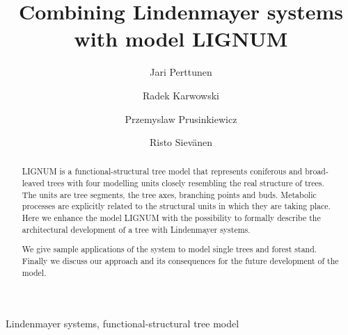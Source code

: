 \documentclass{elsart}
\begin{document}
\begin{frontmatter}


\title{Combining Lindenmayer systems with model LIGNUM}
\author[Metla]{Jari Perttunen}
\author[Calgary]{Radek Karwowski}
\author[Calgary]{Przemyslaw Prusinkiewicz}
\author[Metla]{Risto Siev\"anen}

\address[Metla]{Finnish Forest Research Insititute. Vantaa Research Station. 
                              Jokiniemenkuja 1. PL 18. 01301 Vantaa. Finland.}
\address[Calgary]{University of Calgary}




\begin{abstract}
  LIGNUM  is  a   functional-structural  tree  model  that  represents
  coniferous and broad-leaved trees  with four modelling units closely
  resembling  the  real  structure  of  trees.   The  units  are  tree
  segments,  the  tree axes,  branching  points  and buds.   Metabolic
  processes are  explicitly related to  the structural units  in which
  they are  taking place.  Here we  enhance the model  LIGNUM with the
  possibility to formally describe  the architectural development of a
  tree with Lindenmayer systems.
  
  We give sample applications of  the system to model single trees and
  forest stand.  Finally we discuss our approach  and its consequences
  for the future development of the model.
\end{abstract}

\begin{keyword}

 Lindenmayer systems, functional-structural tree model


\end{keyword}

\end{frontmatter}








\end{document}
